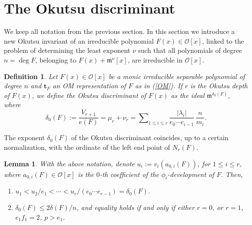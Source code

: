 \documentclass{amsart}
\newtheorem{lemma}[theorem]{Lemma}
\newtheorem{definition}[theorem]{Definition}
\begin{document}
\section{The Okutsu discriminant}\label{secOkDisc}
We keep all notation from the previous section.
In this section we introduce a new Okutsu invariant of an irreducible polynomial $F(x)\in{\mathcal{O}}[x]$, linked to the problem of determining the least exponent $\nu$ such that all polynomials of degree $n=\deg F$, belonging to $F(x)+{{\mathfrak m}}^\nu[x]$, are irreducible in ${\mathcal{O}}[x]$.

\begin{definition}\label{okutsudisc}
Let $F(x)\in{\mathcal{O}}[x]$ be a monic irreducible separable polynomial of degree $n$ and ${\mathbf{t}}_F$ an OM representation of $F$ as in (\ref{OM}). If $r$ is the Okutsu depth of $F(x)$, we define the \emph{Okutsu discriminant} of $F(x)$ as the ideal ${{\mathfrak m}}^{\delta_0(F)}$, where
\begin{equation}\label{delta0}
\delta_0(F):=\dfrac{V_{r+1}}{e(F)}=\mu_r+\nu_r=\sum\nolimits_{1\le i\le r}\dfrac{|\lambda_i|}{e_0\cdots e_{i-1}}\,\dfrac{n}{m_i}. 
\end{equation}
\end{definition}

The exponent $\delta_0(F)$ of the Okutsu discriminant coincides, up to a certain normalization, 
with the ordinate of the left end point of $N_r(F)$. 

\begin{lemma}\label{delta0props}
With the above notation, denote $u_i:=v_i(a_{0,i}(F))$, for $1\le i\le r$, where $a_{0,i}(F)\in{\mathcal{O}}[x]$ is the $0$-th coefficient of the $\phi_i$-development of $F$. Then,
\begin{enumerate}
\item $u_1<u_2/e_1<\cdots<u_r/(e_0\cdots e_{r-1})=\delta_0(F)$.
\item $\delta_0(F)\le 2\delta(F)/n$, and equality holds if and only if either $r=0$, or $r=1$, $e_1f_1=2$, $p>e_1$.
\end{enumerate}
\end{lemma}
\end{document}
